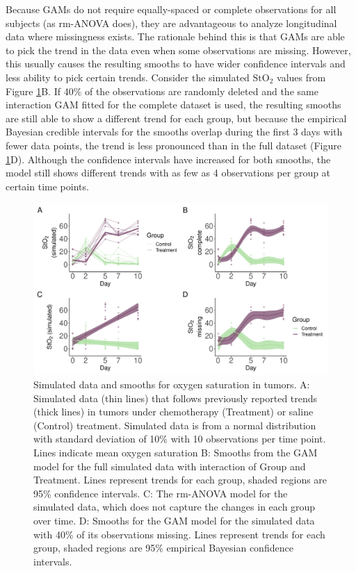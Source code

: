 \documentclass[
]{article}
\begin{document}
Because GAMs do not require equally-spaced or complete observations for all subjects (as rm-ANOVA does), they are advantageous to analyze longitudinal data where missingness exists. The rationale behind this is that GAMs are able to pick the trend in the data even when some observations are missing. However, this usually causes the resulting smooths to have wider confidence intervals and less ability to pick certain trends. Consider the simulated \(\mbox{StO}_2\) values from Figure \ref{fig:sim-smooth-plot}B. If 40\% of the observations are randomly deleted and the same interaction GAM fitted for the complete dataset is used, the resulting smooths are still able to show a different trend for each group, but because the empirical Bayesian credible intervals for the smooths overlap during the first 3 days with fewer data points, the trend is less pronounced than in the full dataset (Figure \ref{fig:sim-smooth-plot}D). Although the confidence intervals have increased for both smooths, the model still shows different trends with as few as 4 observations per group at certain time points.



\begin{figure}

{\centering \includegraphics[width=1\linewidth]{Full_document_SIM_No_Appendix_files/figure-latex/sim-smooth-plot-1} 

}

\caption{Simulated data and smooths for oxygen saturation in tumors. A: Simulated data (thin lines) that follows previously reported trends (thick lines) in tumors under chemotherapy (Treatment) or saline (Control) treatment. Simulated data is from a normal distribution with standard deviation of 10\% with 10 observations per time point. Lines indicate mean oxygen saturation B: Smooths from the GAM model for the full simulated data with interaction of Group and Treatment. Lines represent trends for each group, shaded regions are 95\% confidence intervals. C: The rm-ANOVA model for the simulated data, which does not capture the changes in each group over time. D: Smooths for the GAM model for the simulated data with 40\% of its observations missing. Lines represent trends for each group, shaded regions are 95\% empirical Bayesian confidence intervals.}\label{fig:sim-smooth-plot}
\end{figure}
\end{document}
